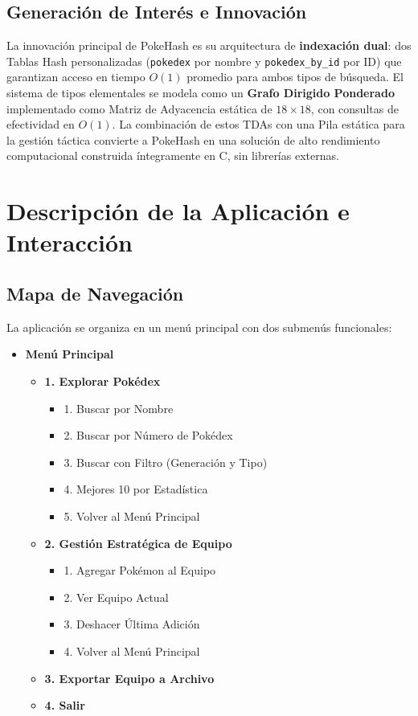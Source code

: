\documentclass[12pt, letterpaper]{article}
\begin{document}
\subsection{Generación de Interés e Innovación}

La innovación principal de PokeHash es su arquitectura de \textbf{indexación dual}: dos Tablas Hash personalizadas (\texttt{pokedex} por nombre y \texttt{pokedex\_by\_id} por ID) que garantizan acceso en tiempo $O(1)$ promedio para ambos tipos de búsqueda. El sistema de tipos elementales se modela como un \textbf{Grafo Dirigido Ponderado} implementado como Matriz de Adyacencia estática de $18\times18$, con consultas de efectividad en $O(1)$. La combinación de estos TDAs con una Pila estática para la gestión táctica convierte a PokeHash en una solución de alto rendimiento computacional construida íntegramente en C, sin librerías externas.

\section{Descripción de la Aplicación e Interacción}

\subsection{Mapa de Navegación}

La aplicación se organiza en un menú principal con dos submenús funcionales:

\begin{itemize}[leftmargin=1.5cm]
    \item \textbf{Menú Principal}
    \begin{itemize}
        \item \textbf{1. Explorar Pokédex}
        \begin{itemize}
            \item 1. Buscar por Nombre
            \item 2. Buscar por Número de Pokédex
            \item 3. Buscar con Filtro (Generación y Tipo)
            \item 4. Mejores 10 por Estadística
            \item 5. Volver al Menú Principal
        \end{itemize}
        \item \textbf{2. Gestión Estratégica de Equipo}
        \begin{itemize}
            \item 1. Agregar Pokémon al Equipo
            \item 2. Ver Equipo Actual
            \item 3. Deshacer Última Adición
            \item 4. Volver al Menú Principal
        \end{itemize}
        \item \textbf{3. Exportar Equipo a Archivo}
        \item \textbf{4. Salir}
    \end{itemize}
\end{itemize}
\end{document}
